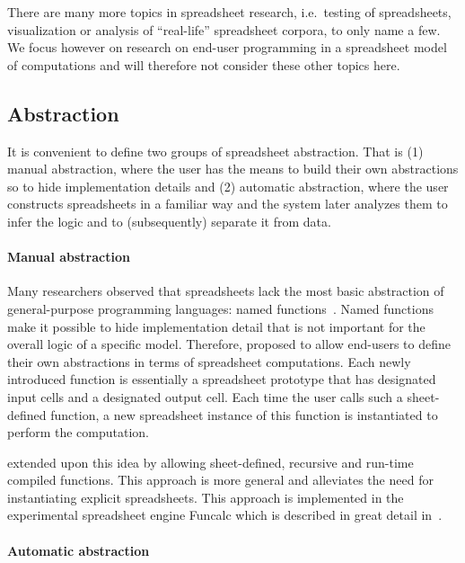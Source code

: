 \documentclass[a4paper]{article}
\begin{document}
There are many more topics in spreadsheet research, i.e.\ testing of spreadsheets, visualization or analysis of ``real-life'' spreadsheet corpora, to only name a few. We focus however on research on end-user programming in a spreadsheet model of computations and will therefore not consider these other topics here.

\subsection{Abstraction}
\label{sec:abstraction}

It is convenient to define two groups of spreadsheet abstraction. That is (1) manual abstraction, where the user has the means to build their own abstractions so to hide implementation details and (2) automatic abstraction, where the user constructs spreadsheets in a familiar way and the system later analyzes them to infer the logic and to (subsequently) separate it from data.

\paragraph{Manual abstraction}

Many researchers observed that spreadsheets lack the most basic abstraction of general-purpose programming languages: named functions~\cite{Jones:2003:UAF:944705.944721}. Named functions make it possible to hide implementation detail that is not important for the overall logic of a specific model. Therefore,
\citet{Jones:2003:UAF:944705.944721} proposed to allow end-users to define their own abstractions in terms of spreadsheet computations. Each newly introduced function is essentially a spreadsheet prototype that has designated input cells and a designated output cell. Each time the user calls such a sheet-defined function, a new spreadsheet instance of this function is instantiated to perform the computation.

\citet{Sestoft:2008:IFS:1370847.1370867} extended upon this idea by allowing sheet-defined, recursive and run-time compiled functions. This approach is more general and alleviates the need for instantiating explicit spreadsheets. This approach is implemented in the experimental spreadsheet engine Funcalc which is described in great detail in~\cite{Sestoft2014Spreadsheet}.

\paragraph{Automatic abstraction}
\end{document}

